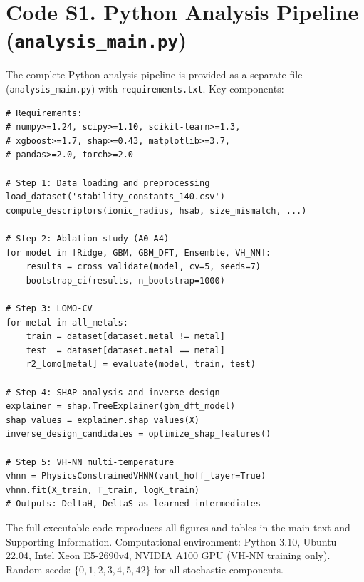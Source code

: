 \documentclass[journal=jacsat,manuscript=suppinfo]{achemso}
\begin{document}
\section*{Code S1. Python Analysis Pipeline (\texttt{analysis\_main.py})}

The complete Python analysis pipeline is provided as a separate file
(\texttt{analysis\_main.py}) with \texttt{requirements.txt}.
Key components:

\begin{lstlisting}[caption={Key pipeline structure (pseudocode)}]
# Requirements:
# numpy>=1.24, scipy>=1.10, scikit-learn>=1.3,
# xgboost>=1.7, shap>=0.43, matplotlib>=3.7,
# pandas>=2.0, torch>=2.0

# Step 1: Data loading and preprocessing
load_dataset('stability_constants_140.csv')
compute_descriptors(ionic_radius, hsab, size_mismatch, ...)

# Step 2: Ablation study (A0-A4)
for model in [Ridge, GBM, GBM_DFT, Ensemble, VH_NN]:
    results = cross_validate(model, cv=5, seeds=7)
    bootstrap_ci(results, n_bootstrap=1000)

# Step 3: LOMO-CV
for metal in all_metals:
    train = dataset[dataset.metal != metal]
    test  = dataset[dataset.metal == metal]
    r2_lomo[metal] = evaluate(model, train, test)

# Step 4: SHAP analysis and inverse design
explainer = shap.TreeExplainer(gbm_dft_model)
shap_values = explainer.shap_values(X)
inverse_design_candidates = optimize_shap_features()

# Step 5: VH-NN multi-temperature
vhnn = PhysicsConstrainedVHNN(vant_hoff_layer=True)
vhnn.fit(X_train, T_train, logK_train)
# Outputs: DeltaH, DeltaS as learned intermediates
\end{lstlisting}

The full executable code reproduces all figures and tables in the main text
and Supporting Information.
Computational environment: Python 3.10, Ubuntu 22.04, Intel Xeon E5-2690v4,
NVIDIA A100 GPU (VH-NN training only).
Random seeds: $\{0, 1, 2, 3, 4, 5, 42\}$ for all stochastic components.


\end{document}
